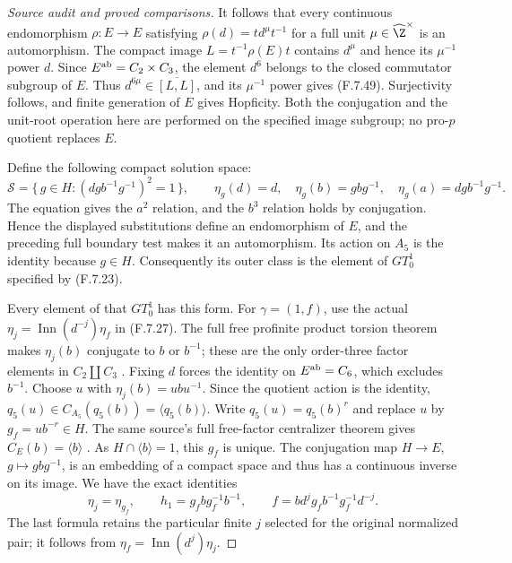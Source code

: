 \begin{proof}[Source audit and proved comparisons]
It follows that every continuous endomorphism
$\rho:E\to E$ satisfying
$\rho(d)=t d^\mu t^{-1}$ for a full unit
$\mu\in\widehat\Z^\times$ is an automorphism.
The compact image $L=t^{-1}\rho(E)t$ contains
$d^\mu$ and hence its $\mu^{-1}$ power $d$.
Since $E^{\rm ab}=C_2\times C_3$, the element
$d^6$ belongs to the closed commutator subgroup
of $E$.  Thus $d^{6\mu}\in\overline{[L,L]}$,
and its $\mu^{-1}$ power gives (F.7.49).
Surjectivity follows, and finite generation of $E$
gives Hopficity.  Both the conjugation and the
unit-root operation here are performed on the
specified image subgroup; no pro-$p$ quotient
replaces $E$.

Define the following compact solution space:
\[
 \mathscr S=
 \{\,g\in H:(d g b^{-1}g^{-1})^2=1\,\},\qquad
 \eta_g(d)=d,\quad
 \eta_g(b)=g b g^{-1},\quad
 \eta_g(a)=d g b^{-1}g^{-1}.
                                                               \tag{F.7.50}
\]
The equation gives the $a^2$ relation, and the
$b^3$ relation holds by conjugation.  Hence the
displayed substitutions define an endomorphism
of $E$, and the preceding full boundary test makes
it an automorphism.  Its action on $A_5$ is the
identity because $g\in H$.  Consequently its outer
class is the element of $GT_0^1$ specified by
(F.7.23).

Every element of that $GT_0^1$ has this form.
For $\gamma=(1,f)$, use the actual
$\eta_j=\operatorname{Inn}(d^{-j})\eta_f$ in
(F.7.27).  The full free profinite product torsion
theorem makes $\eta_j(b)$ conjugate to $b$ or
$b^{-1}$; these are the only order-three factor
elements in $C_2\amalg C_3$
\cite[Theorem A and Section 3]{A-HerfortRibes1985}.
Fixing $d$ forces the identity on
$E^{\rm ab}=C_6$, which excludes $b^{-1}$.
Choose $u$ with $\eta_j(b)=ubu^{-1}$.
Since the quotient action is the identity,
$q_5(u)\in C_{A_5}(q_5(b))=\langle q_5(b)\rangle$.
Write $q_5(u)=q_5(b)^r$ and replace $u$ by
$g_f=ub^{-r}\in H$.  The same source's full
free-factor centralizer theorem gives
$C_E(b)=\langle b\rangle$
\cite[Theorem B and Section 4]{A-HerfortRibes1985}.
As $H\cap\langle b\rangle=1$, this $g_f$ is unique.
The conjugation map $H\to E$, $g\mapsto gbg^{-1}$,
is an embedding of a compact space and thus has
a continuous inverse on its image.
We have the exact identities
\[
 \eta_j=\eta_{g_f},\qquad
 h_1=g_f b g_f^{-1}b^{-1},\qquad
 f=b d^j g_f b^{-1}g_f^{-1}d^{-j}.
                                                               \tag{F.7.51}
\]
The last formula retains the particular finite
$j$ selected for the original normalized pair;
it follows from $\eta_f=\operatorname{Inn}(d^j)\eta_j$.


\end{proof}

